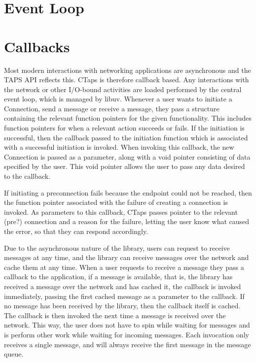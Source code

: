 \section{Event Loop}

\section{Callbacks} 
Most modern interactions with networking applications are asynchronous
and the TAPS API reflects this. CTaps is therefore callback based. Any
interactions with the network or other I/O-bound activities are loaded
performed by the central event loop, which is managed by libuv. Whenever
a user wants to initiate a Connection, send a message or receive a message,
they pass a structure containing the relevant function pointers for the given
functionality. 
This includes function pointers for when a relevant action succeeds or fails.
If the initiation is successful, then the callback passed to the initiation
function which is associated with a successful initiation is invoked. 
When invoking this callback, the new Connection is passed as a parameter,
along with a void pointer consisting of data specified by the user.
This void pointer allows the user to pass any data desired to the callback.

If initiating a preconnection fails because the endpoint could not be
reached, then the function pointer associated with the failure of creating
a connection is invoked. 
As parameters to this callback, CTaps passes pointer to the relevant (pre?) connection 
and a reason for the failure, letting the user know what caused the error,
so that they can respond accordingly.

Due to the asynchronous nature of the library, users can request to
receive messages at any time, and the library can receive messages
over the network and cache them at any time. When a user requests
to receive a message they pass a callback to the application, if a
message is available, that is, the library has received a message
over the network and has cached it, the callback is invoked immediately,
passing the first cached message as a parameter to the callback.
If no message has been received by the library, then the callback
itself is cached. The callback is then invoked the next time a message
is received over the network. This way, the user does not have to
spin while waiting for messages and is perform other work while
waiting for incoming messages. Each invocation only receives
a single message, and will always receive the first message in
the message queue.

